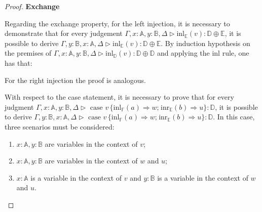 \documentclass[10pt,a4paper]{amsart}
\theoremstyle{definition}
\theoremstyle{definition}
\theoremstyle{definition}
\theoremstyle{definition}
\theoremstyle{definition}
\theoremstyle{definition}
\begin{document}
  \begin{proof}

    \textbf{Exchange}

    Regarding the exchange property, for the left injection, it is necessary to demonstrate that for every judgement $\Gamma , x:\mathbb{A}, y:\mathbb{B},\Delta\triangleright \text{inl}_{\mathbb{E}}(v):  \mathbb{D} \oplus \mathbb{E}$, it is possible to derive $\Gamma ,y:\mathbb{B}, x:\mathbb{A}, \Delta \triangleright \text{inl}_{\mathbb{E}}(v):  \mathbb{D} \oplus \mathbb{E}$. By induction hypothesis on the premises of $\Gamma , x:\mathbb{A}, y:\mathbb{B},\Delta\triangleright \text{inl}_{\mathbb{D}}(v):  \mathbb{D} \oplus \mathbb{D}$ and applying the inl rule, one has that:

    \begin{figure}[H]
      \centering
      \begin{prooftree}
      \end{prooftree}
      \end{figure}

  For the right injection the proof is analogous.

With respect to the case statement, it is necessary to prove that for every judgment $\Gamma, x:\mathbb{A}, y:\mathbb{B}, \Delta \triangleright \text{ case } v \hspace{2pt} \{\text{inl}_{\mathbb{F}}  (a) \Rightarrow w ; \hspace{1pt} \text{inr}_{\mathbb{E}}  (b) \Rightarrow u\}: \mathbb{D}$, it is possible to derive $\Gamma, y:\mathbb{B}, x:\mathbb{A}, \Delta \triangleright \text{ case } v \hspace{2pt} \{\text{inl}_{\mathbb{F}} (a) \Rightarrow w ; \hspace{1pt} \text{inr}_{\mathbb{E}} (b) \Rightarrow u\}: \mathbb{D}$. In this case, three scenarios must be considered:
\begin{enumerate}
  \item $x:\mathbb{A}, y:\mathbb{B}$ are variables in the context of $v$;
  \item $x:\mathbb{A}, y:\mathbb{B}$ are variables in the context of $w$ and $u$;
  \item  $x:\mathbb{A}$ is a variable in the context of $v$ and $y:\mathbb{B}$ is a variable in the context of $w$ and $u$.
\end{enumerate}


\end{proof}
\end{document}
